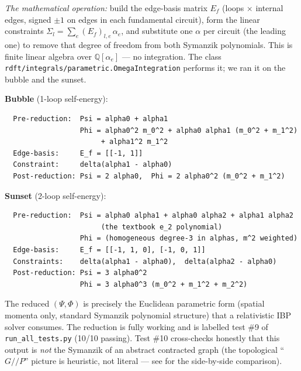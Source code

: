 \documentclass[11pt,a4paper]{article}
\theoremstyle{definition}
\theoremstyle{plain}
\begin{document}
\begin{codebox}
\emph{The mathematical operation:} build the edge-basis matrix
$E_f$ (loops $\times$ internal edges, signed $\pm 1$ on edges in each
fundamental circuit), form the linear constraints
$\Sigma_l = \sum_e (E_f)_{l,e}\,\alpha_e$, and substitute one $\alpha$
per circuit (the leading one) to remove that degree of freedom from
both Symanzik polynomials.  This is finite linear algebra over
$\mathbb{Q}[\alpha_e]$ --- no integration.  The class
\texttt{rdft/integrals/parametric.OmegaIntegration} performs it; we
ran it on the bubble and the sunset.

\textbf{Bubble} (1-loop self-energy):
\begin{verbatim}
  Pre-reduction:  Psi = alpha0 + alpha1
                  Phi = alpha0^2 m_0^2 + alpha0 alpha1 (m_0^2 + m_1^2)
                       + alpha1^2 m_1^2
  Edge-basis:     E_f = [[-1, 1]]
  Constraint:     delta(alpha1 - alpha0)
  Post-reduction: Psi = 2 alpha0,  Phi = 2 alpha0^2 (m_0^2 + m_1^2)
\end{verbatim}

\textbf{Sunset} (2-loop self-energy):
\begin{verbatim}
  Pre-reduction:  Psi = alpha0 alpha1 + alpha0 alpha2 + alpha1 alpha2
                       (the textbook e_2 polynomial)
                  Phi = (homogeneous degree-3 in alphas, m^2 weighted)
  Edge-basis:     E_f = [[-1, 1, 0], [-1, 0, 1]]
  Constraints:    delta(alpha1 - alpha0),  delta(alpha2 - alpha0)
  Post-reduction: Psi = 3 alpha0^2
                  Phi = 3 alpha0^3 (m_0^2 + m_1^2 + m_2^2)
\end{verbatim}

The reduced $(\Psi, \Phi)$ is precisely the Euclidean parametric form
(spatial momenta only, standard Symanzik polynomial structure) that a
relativistic IBP solver consumes.  The reduction is fully working and
is labelled test \#9 of \texttt{run\_all\_tests.py} (10/10 passing).
Test \#10 cross-checks honestly that this output is \emph{not} the
Symanzik of an abstract contracted graph (the topological
``$G//P$'' picture is heuristic, not literal --- see
 for the side-by-side comparison).
\end{codebox}
\end{document}
